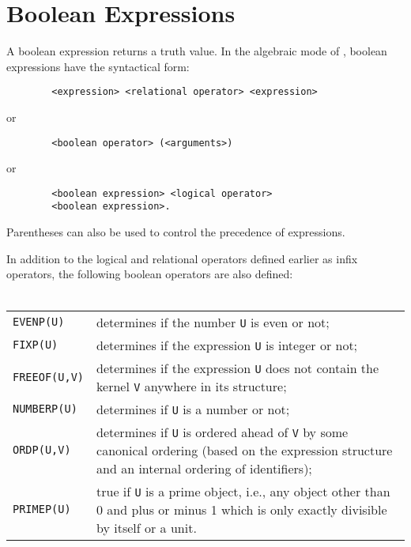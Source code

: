 \section{Boolean Expressions}
\label{sec-boolean}
A boolean expression returns a truth value.  In the
algebraic mode of {\REDUCE}, boolean expressions have the syntactical form:
\begin{verbatim}
        <expression> <relational operator> <expression>
\end{verbatim}
or
\begin{verbatim}
        <boolean operator> (<arguments>)
\end{verbatim}
or
\begin{verbatim}
        <boolean expression> <logical operator>
        <boolean expression>.
\end{verbatim}
Parentheses can also be used to control the precedence of expressions.

In addition to the logical and relational operators defined earlier as
infix operators, the following boolean operators are also defined:\\
\mbox{}\\
{\renewcommand{\arraystretch}{2}
\begin{tabular}{lp{\redboxwidth}}
{\tt EVENP(U)} & determines if the number {\tt U} is even or not; \\

{\tt FIXP(U)} & determines if the expression {\tt U} is integer or not; \\

{\tt FREEOF(U,V)} & determines if the expression
{\tt U} does not contain the kernel {\tt V} anywhere in its
structure; \\

{\tt NUMBERP(U)} & determines if {\tt U} is a number or not; \\

{\tt ORDP(U,V)} & determines if {\tt U} is ordered
ahead of {\tt V} by some canonical ordering (based on the expression structure
and an internal ordering of identifiers); \\

{\tt PRIMEP(U)} & true if {\tt U} is a prime object, i.e., any object
other than 0 and plus or minus 1 which is only exactly divisible
by itself or a unit.
 \\
\end{tabular}}

